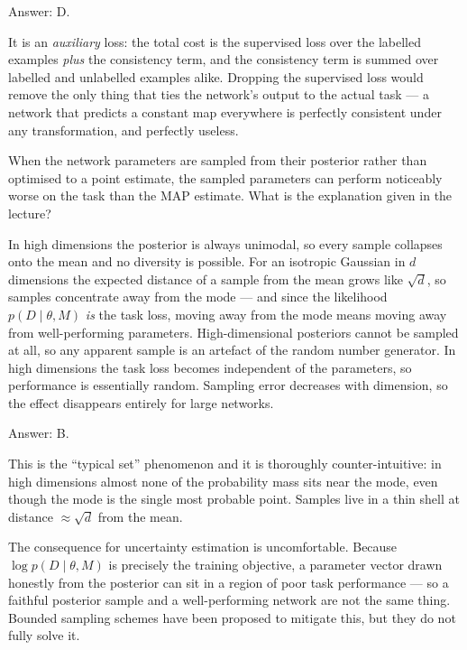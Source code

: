 \documentclass[11pt]{exam}
\begin{document}
\begin{questions}
\begin{solution}
  Answer: D.

  It is an \emph{auxiliary} loss: the total cost is the supervised loss over the labelled examples
  \emph{plus} the consistency term, and the consistency term is summed over labelled and unlabelled
  examples alike. Dropping the supervised loss would remove the only thing that ties the network's
  output to the actual task --- a network that predicts a constant map everywhere is perfectly
  consistent under any transformation, and perfectly useless.
\end{solution}

\question
When the network parameters are sampled from their posterior rather than optimised to a point
estimate, the sampled parameters can perform noticeably worse on the task than the MAP estimate.
What is the explanation given in the lecture?

\begin{choices}
  \choice In high dimensions the posterior is always unimodal, so every sample collapses onto the
  mean and no diversity is possible.
  \choice For an isotropic Gaussian in $d$ dimensions the expected distance of a sample from the
  mean grows like $\sqrt{d}$, so samples concentrate away from the mode --- and since the likelihood
  $p(D \mid \theta, M)$ \emph{is} the task loss, moving away from the mode means moving away from
  well-performing parameters.
  \choice High-dimensional posteriors cannot be sampled at all, so any apparent sample is an
  artefact of the random number generator.
  \choice In high dimensions the task loss becomes independent of the parameters, so performance is
  essentially random.
  \choice Sampling error decreases with dimension, so the effect disappears entirely for large
  networks.
\end{choices}

\begin{solution}
  Answer: B.

  This is the ``typical set'' phenomenon and it is thoroughly counter-intuitive: in high dimensions
  almost none of the probability mass sits near the mode, even though the mode is the single most
  probable point. Samples live in a thin shell at distance $\approx \sqrt{d}$ from the mean.

  The consequence for uncertainty estimation is uncomfortable. Because $\log p(D \mid \theta, M)$ is
  precisely the training objective, a parameter vector drawn honestly from the posterior can sit in
  a region of poor task performance --- so a faithful posterior sample and a well-performing network
  are not the same thing. Bounded sampling schemes have been proposed to mitigate this, but they do
  not fully solve it.
\end{solution}


\end{questions}
\end{document}
